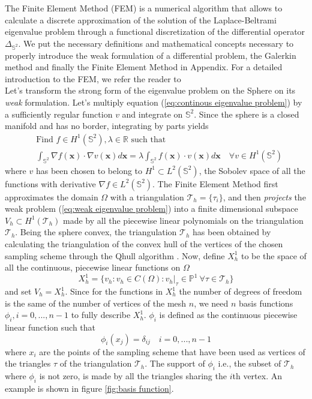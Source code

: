 The Finite Element Method (FEM) is a numerical algorithm that allows to calculate a discrete approximation of the solution of the Laplace-Beltrami eigenvalue problem through a functional discretization of the differential operator $\Delta_{\mathbb S^2}$.  We put the necessary definitions and mathematical concepts necessary to properly introduce the weak formulation of a differential problem, the Galerkin method and finally the Finite Element Method in Appendix. For a detailed introduction to the FEM, we refer the reader to \cite{Quarteroni:1639539}\\
Let's transform the strong form of the eigenvalue problem on the Sphere on its \textit{weak} formulation. Let's multiply equation (\ref{eq:continous eigenvalue problem}) by a sufficiently regular function $v$ and integrate on $\mathbb S^2$. Since the sphere is a closed manifold and has no border, integrating by parts yields
\begin{equation}\label{eq:weak eigenvalue problem}
\begin{split}
&\text{Find } f\in H^1(\mathbb S^2), \lambda\in\mathbb R\text{ such that }\\ 
&\int_{\mathbb S^2} \nabla f(\mathbf x)\cdot\nabla v(\mathbf x) d\mathbf x = \lambda \int_{\mathbb S^2} f(\mathbf x)\cdot v(\mathbf x)d\mathbf x\quad \forall v\in H^1(\mathbb S^2)
\end{split}
\end{equation}
where $v$ has been chosen to belong to $H^1\subset L^2(\mathbb S^2)$, the Sobolev space of all the functions with derivative $\nabla f\in L^2(\mathbb S^2)$. The Finite Element Method first approximates the domain $\Omega$ with a triangulation $\mathcal T_h=\{ \tau_i \}$, and then \textit{projects} the weak problem (\ref{eq:weak eigenvalue problem}) into a finite dimensional subspace $V_h\subset H^1(\mathcal T_h)$ made by all the piecewise linear polynomials on the triangulation $\mathcal T_h$. Being the sphere convex, the triangulation $\mathcal T_h$ has been obtained by calculating the triangulation of the convex hull of the vertices of the chosen sampling scheme through the Qhull algorithm \cite{Barber96thequickhull}. Now, define $X_h^1$ to be the space of all the continuous, piecewise linear functions on $\Omega$
$$X_h^{1}=\{v_h: v_h\in C(\Omega): \left.v_h\right|_{\tau}\in\mathbb P^1\  \forall \tau\in \mathcal T_h\}$$ 
and set $V_h=X_h^1$. Since for the functions in $X_h^1$ the number of degrees of freedom is the same of the number of vertices of the mesh $n$, we need  $n$ basis functions $\phi_i, i=0,...,n-1$ to fully describe $X_h^{1}$. $\phi_i$ is defined as the continuous piecewise linear function such that 
$$
\phi_i(x_j) = \delta_{ij}\quad i=0,...,n-1
$$
where $x_i$ are the points of the sampling scheme that have been used as vertices of the triangles $\tau$ of the triangulation $\mathcal T_h$. The support of $\phi_i$ i.e., the subset of $\mathcal T_h$ where $\phi_i$ is not zero, is made by all the triangles sharing the $i$th vertex. An example is shown in figure \ref{fig:basis function}.

